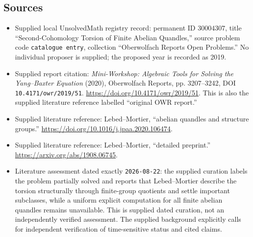 \documentclass[11pt]{article}
\begin{document}
\subsection{Sources}
\begin{itemize}
\item Supplied local UnsolvedMath registry record: permanent ID \(30004307\), title ``Second-Cohomology Torsion of Finite Abelian Quandles,'' source problem code \texttt{catalogue entry}, collection ``Oberwolfach Reports Open Problems.'' No individual proposer is supplied; the proposed year is recorded as 2019.
\item Supplied report citation: \emph{Mini-Workshop: Algebraic Tools for Solving the Yang--Baxter Equation} (2020), Oberwolfach Reports, pp. 3207--3242, DOI \texttt{10.4171/owr/2019/51}. \url{https://doi.org/10.4171/owr/2019/51}. This is also the supplied literature reference labelled ``original OWR report.''
\item Supplied literature reference: Lebed--Mortier, ``abelian quandles and structure groups.'' \url{https://doi.org/10.1016/j.jpaa.2020.106474}.
\item Supplied literature reference: Lebed--Mortier, ``detailed preprint.'' \url{https://arxiv.org/abs/1908.06745}.
\item Literature assessment dated exactly \texttt{2026-08-22}: the supplied curation labels the problem partially solved and reports that Lebed--Mortier describe the torsion structurally through finite-group quotients and settle important subclasses, while a uniform explicit computation for all finite abelian quandles remains unavailable. This is supplied dated curation, not an independently verified assessment. The supplied background explicitly calls for independent verification of time-sensitive status and cited claims.
\end{itemize}
\end{document}
